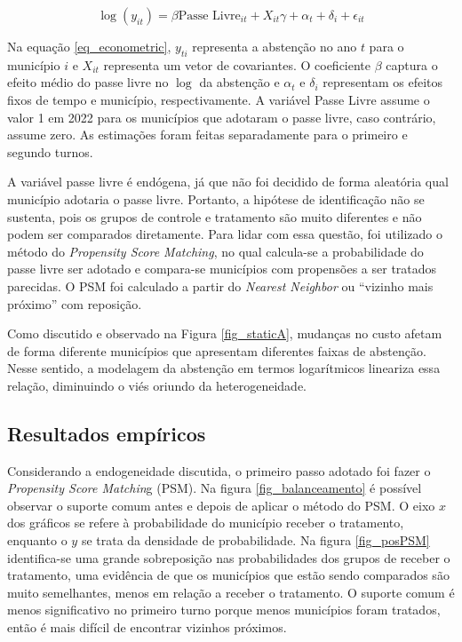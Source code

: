 \begin{equation}
\label{eq_econometric}
    \log{(y_{it})}=\beta\text{Passe Livre}_{it} + X_{it}\gamma + \alpha_t + \delta_i + \epsilon_{it}
\end{equation}

Na equação \ref{eq_econometric}, $y_{ti}$ representa a abstenção no ano $t$ para o município $i$ e $X_{it}$ representa um vetor de covariantes. O coeficiente $\beta$ captura o efeito médio do passe livre no $\log$ da abstenção e $\alpha_t$ e $\delta_i$ representam os efeitos fixos de tempo e município, respectivamente. A variável Passe Livre assume o valor 1 em 2022 para os municípios que adotaram o passe livre, caso contrário, assume zero. As estimações foram feitas separadamente para o primeiro e segundo turnos. 

A variável passe livre é endógena, já que não foi decidido de forma aleatória qual município adotaria o passe livre. Portanto, a hipótese de identificação não se sustenta, pois os grupos de controle e tratamento são muito diferentes e não podem ser comparados diretamente. Para lidar com essa questão, foi utilizado o método do \textit{Propensity Score Matching}, no qual calcula-se a probabilidade do passe livre ser adotado e compara-se municípios com propensões a ser tratados parecidas. O PSM foi calculado a partir do \textit{Nearest Neighbor} ou ``vizinho mais próximo'' com reposição.

Como discutido e observado na Figura \ref{fig_staticA}, mudanças no custo afetam de forma diferente municípios que apresentam diferentes faixas de abstenção. Nesse sentido, a modelagem da abstenção em termos logarítmicos lineariza essa relação, diminuindo o viés oriundo da heterogeneidade. 

\subsection{Resultados empíricos}

Considerando a endogeneidade discutida, o primeiro passo adotado foi fazer o \textit{Propensity Score Matchin}g (PSM). Na figura \ref{fig_balanceamento} é possível observar o suporte comum antes e depois de aplicar o método do PSM. O eixo $x$ dos gráficos se refere à probabilidade do município receber o tratamento, enquanto o $y$ se trata da densidade de probabilidade. Na figura \ref{fig_posPSM} identifica-se uma grande sobreposição nas probabilidades dos grupos de receber o tratamento, uma evidência de que os municípios que estão sendo comparados são muito semelhantes, menos em relação a receber o tratamento. O suporte comum é menos significativo no primeiro turno porque menos municípios foram tratados, então é mais difícil de encontrar vizinhos próximos.

